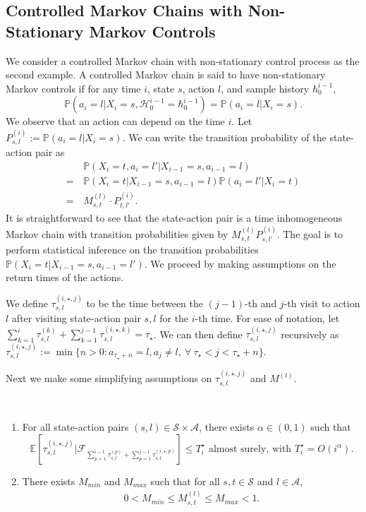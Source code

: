 \documentclass[twoside,11pt]{article}
\newcommand{\pow}[1]{^{(#1)}}%
\numberwithin{equation}{section}
\newcommand{\lp}{\left(}
\newcommand{\rp}{\right)}
\newcommand{\History}{\mathcal{H}}
\newcommand{\history}{\hbar}
\newcommand{\Pbb}{\mathbb{P}}
\newcommand{\Fcal}{\mathcal{F}}
\newcommand{\prob}{\Pbb}
\newcommand{\expec}{\mathbb{E}}
\newcommand{\probl}{\prob}
\begin{document}
\subsection{Controlled Markov Chains with Non-Stationary Markov Controls}
\label{sec:non-stat-chain}
We consider a controlled Markov chain with non-stationary control process as the second example.
A controlled Markov chain is said to have non-stationary Markov controls if for any time $i$, state $s$, action $l$, and sample history $\history_0^{i-1}$,
\[
\probl\lp a_i=l|X_i=s,\History_0^{i-1}=\history_0^{i-1}\rp=\probl\lp a_i=l|X_i =s\rp.
\]
We observe that an action can depend on the time $i$. 
Let $P_{s,l}^{(i)} := \prob(a_i=l|X_i=s)$.
We can write the transition probability of the state-action pair as
\begin{align*}
    &\prob\lp X_i=t,a_i=l'|X_{i-1}=s,a_{i-1}=l\rp\\
     = \, & \prob\lp X_i=t|X_{i-1}=s,a_{i-1}=l\rp\prob(a_i=l'|X_i=t)
     \\
     = \, & M_{s,t}^{(l)}\cdot P_{t,l'}^{(i)}.
\end{align*}
It is straightforward to see that the state-action pair is a time inhomogeneous Markov chain with transition probabilities given by $M_{s,t}^{(l)} P_{s,l'}^{(i)}$. 
The goal is to perform statistical inference on the transition probabilities $\prob(X_i=t|X_{i-1}=s,a_{i-1}=l')$. 
We proceed by making assumptions on the return times of the actions.
\begin{definition}
We define $\tau_{s,l}\pow{i,\star,j}$ to be the time between the $(j-1)$-th and $j$-th visit to action $l$ after visiting state-action pair $s,l$ for the $i$-th time. 
For ease of notation, let $ \sum_{k=1}^i\tau_{s,l}\pow{k}+\sum_{k=1}^{j-1}\tau^{(i,\star,k)}_{s,l}=\tau_\star$. We can then define $\tau_{s,l}\pow{i,\star,j}$ recursively as
$\tau_{s,l}\pow{i,\star,j}:= \min\{n > 0: a_{\tau_\star+n}=l,a_{j}\neq l, \ \forall \ \tau_\star<j<\tau_\star+n\}.
$
\end{definition}
Next we make some simplifying assumptions on $\tau_{s,l}\pow{i,\star,j}$ and $M\pow{l}$.
\begin{assumption}~\label{ass:markov}
\begin{enumerate}
    \item For all state-action pairs $(s,l) \in \mathcal{S}\times\mathcal{A}$, there exists $\alpha \in (0, 1)$ such that
    \[ \expec[\tau_{s,l}\pow{i,\star,j}|\Fcal_{\sum_{p=1}^{i-1} \tau_{s,l}\pow{p}+\sum_{p=1}^{j-1}\tau_{s,l}\pow{i,\star,p}}] \leq T_i^\star  \text{ almost surely, with }T_i^\star = O(i^\alpha).
    \]
    \item There exists $M_{min}$ and $M_{max}$ such that for all $s,t\in \mathcal{S}$ and $l\in\mathcal{A}$,
    \begin{align}
    0<M_{min}\leq M_{s,t}\pow l\leq M_{max}<1.   \label{eq:markov-eq1}     
    \end{align}
\end{enumerate}
\end{assumption}
\end{document}

